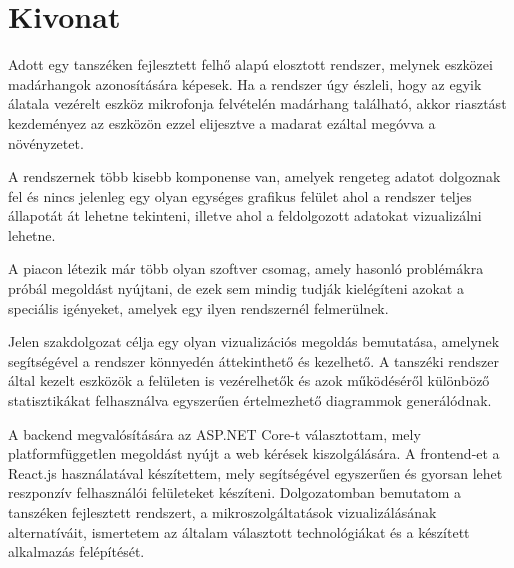 \setcounter{page}{1}

\selecthungarian

\chapter*{Kivonat}

Adott egy tanszéken fejlesztett felhő alapú elosztott rendszer, melynek eszközei madárhangok azonosítására képesek.
Ha a rendszer úgy észleli, hogy az egyik álatala vezérelt eszköz mikrofonja felvételén madárhang található,
akkor riasztást kezdeményez az eszközön ezzel elijesztve a madarat ezáltal megóvva a növényzetet.

A rendszernek több kisebb komponense van, amelyek rengeteg adatot dolgoznak fel és nincs jelenleg egy olyan egységes grafikus felület ahol a rendszer teljes állapotát
át lehetne tekinteni, illetve ahol a feldolgozott adatokat vizualizálni lehetne.

A piacon létezik már több olyan szoftver csomag, amely hasonló problémákra próbál megoldást nyújtani, de ezek sem mindig
tudják kielégíteni azokat a speciális igényeket, amelyek egy ilyen rendszernél felmerülnek.

Jelen szakdolgozat célja egy olyan vizualizációs megoldás bemutatása, amelynek segítségével a rendszer könnyedén áttekinthető
és kezelhető. A tanszéki rendszer által kezelt eszközök a felületen is vezérelhetők 
és azok működéséről különböző statisztikákat felhasználva egyszerűen értelmezhető diagrammok generálódnak.

A backend megvalósítására az ASP.NET Core-t választottam, mely platformfüggetlen megoldást nyújt a web kérések kiszolgálására.
A frontend-et a React.js használatával készítettem, mely segítségével egyszerűen és gyorsan lehet reszponzív felhasználói felületeket készíteni.
Dolgozatomban bemutatom a tanszéken fejlesztett rendszert, a mikroszolgáltatások vizualizálásának alternatíváit,
ismertetem az általam választott technológiákat és a készített alkalmazás felépítését.

\vfill
\selectenglish


